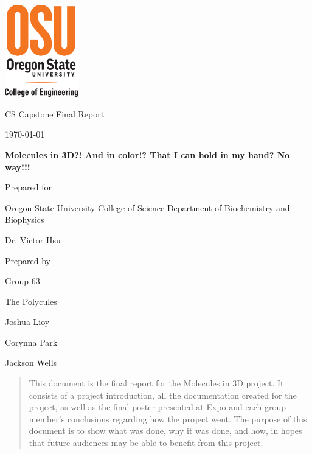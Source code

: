 \documentclass[letterpaper, onecolumn, draftclsnofoot, 10pt, compsoc]{IEEEtran}
\def \CapstoneTeamName{			The Polycules}
\def \CapstoneTeamNumber{		63}
\def \GroupMemberOne{			Joshua Lioy}
\def \GroupMemberTwo{			Corynna Park}
\def \GroupMemberThree{			Jackson Wells}
\def \CapstoneProjectName{		Molecules in 3D?! And in color!? That I can hold in my hand? No way!!!}
\def \CapstoneSponsorCompany{	Oregon State University College of Science Department of Biochemistry and Biophysics}
\def \CapstoneSponsorPerson{	Dr. Victor Hsu}
\def \DocType{	%
					Final Report
					}
\newcommand{\NameSigPair}[1]{\par
	\makebox[2.75in][r]{#1} \hfil 	\makebox[3.25in]{\makebox[2.25in]{\hrulefill} \hfill		\makebox[.75in]{\hrulefill}}
	\par\vspace{-12pt} \textit{\tiny\noindent
	\makebox[2.75in]{} \hfil		\makebox[3.25in]{\makebox[2.25in][r]{Signature} \hfill	\makebox[.75in][r]{Date}}}}
\renewcommand{\NameSigPair}[1]{#1}
\begin{document}
	\begin{titlepage}
		\begin{singlespace}
			\includegraphics[height=4cm]{coe_v_spot1}
			\hfill 
			\par\vspace{.2in}
			\centering
			\scshape{
				\huge CS Capstone \DocType \par
				{\large\today}\par
				\vspace{.5in}
				\textbf{\Huge\CapstoneProjectName}\par
				\vfill
				{\large Prepared for}\par
				\Huge \CapstoneSponsorCompany\par
				\vspace{5pt}
				{\Large\NameSigPair{\CapstoneSponsorPerson}\par}
				{\large Prepared by }\par
				Group\CapstoneTeamNumber\par
				\CapstoneTeamName\par 
				\vspace{5pt}
				{\Large
					\NameSigPair{\GroupMemberOne}\par
					\NameSigPair{\GroupMemberTwo}\par
					\NameSigPair{\GroupMemberThree}\par
				}
				\vspace{20pt}
			}
			\begin{abstract}
				This document is the final report for the Molecules in 3D project. 
				It consists of a project introduction, all the documentation created for the project, as well as the final poster presented at Expo and each group member's conclusions regarding how the project went.
				The purpose of this document is to show what was done, why it was done, and how, in hopes that future audiences may be able to benefit from this project.   
			\end{abstract}     
		\end{singlespace}
	\end{titlepage}
	\newpage
	
\end{document}
